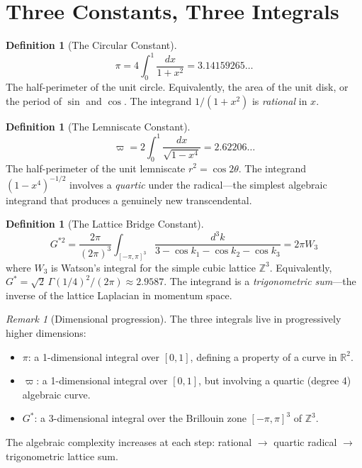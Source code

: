 \documentclass[12pt]{article}
\theoremstyle{definition}
\newtheorem{definition}[theorem]{Definition}
\theoremstyle{remark}
\newtheorem{remark}[theorem]{Remark}
\begin{document}
\section{Three Constants, Three Integrals}
\label{sec:three}

\begin{definition}[The Circular Constant]
\begin{equation}
    \pi = 4\int_0^1 \frac{dx}{1 + x^2} = 3.14159265\ldots
\end{equation}
The half-perimeter of the unit circle. Equivalently, the area of the unit disk, or the period of $\sin$ and $\cos$. The integrand $1/(1+x^2)$ is \emph{rational} in $x$.
\end{definition}

\begin{definition}[The Lemniscate Constant]
\begin{equation}
    \varpi = 2\int_0^1 \frac{dx}{\sqrt{1-x^4}} = 2.62206\ldots
\end{equation}
The half-perimeter of the unit lemniscate $r^2 = \cos 2\theta$. The integrand $(1-x^4)^{-1/2}$ involves a \emph{quartic} under the radical---the simplest algebraic integrand that produces a genuinely new transcendental.
\end{definition}

\begin{definition}[The Lattice Bridge Constant]
\begin{equation}
    G^{*2} = \frac{2\pi}{(2\pi)^3}\int_{[-\pi,\pi]^3} \frac{d^3k}{3 - \cos k_1 - \cos k_2 - \cos k_3} = 2\pi W_3
\end{equation}
where $W_3$ is Watson's integral for the simple cubic lattice $\mathbb{Z}^3$. Equivalently, $G^* = \sqrt{2}\,\Gamma(1/4)^2/(2\pi) \approx 2.9587$. The integrand is a \emph{trigonometric sum}---the inverse of the lattice Laplacian in momentum space.
\end{definition}

\begin{remark}[Dimensional progression]
The three integrals live in progressively higher dimensions:
\begin{itemize}[nosep]
    \item $\pi$: a 1-dimensional integral over $[0,1]$, defining a property of a curve in $\mathbb{R}^2$.
    \item $\varpi$: a 1-dimensional integral over $[0,1]$, but involving a quartic (degree 4) algebraic curve.
    \item $G^*$: a 3-dimensional integral over the Brillouin zone $[-\pi,\pi]^3$ of $\mathbb{Z}^3$.
\end{itemize}
The algebraic complexity increases at each step: rational $\to$ quartic radical $\to$ trigonometric lattice sum.
\end{remark}
\end{document}

